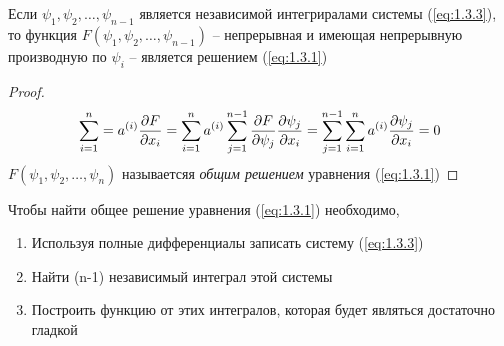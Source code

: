 \documentclass[../main.tex]{subfiles}
\begin{document}
\begin{theorem}
    Если $\psi_1, \psi_2, \dots, \psi_{n-1}$ является независимой интегриралами системы (\ref*{eq:1.3.3}),
    то функция $F(\psi_1, \psi_2, \dots, \psi_{n-1})$ -- непрерывная и имеющая непрерывную
    производную по $\psi_i$ -- является решением (\ref*{eq:1.3.1})
\end{theorem}
\begin{proof}
    \begin{gather*}
        \sum_{i=1}^n = a^{(i)}\frac{\partial F}{\partial x_i} =
        \sum_{i=1}^n a^{(i)} \sum_{j=1}^{n-1}\frac{\partial F}{\partial \psi_j}\frac{\partial \psi_j}{\partial x_i} =
        \sum_{j=1}^{n-1} \sum_{i=1}^n a^{(i)} \frac{\partial \psi_j}{\partial x_i} = 0
    \end{gather*}
    $F(\psi_1, \psi_2,\dots,\psi_n)$ называетсяя \textit{общим решением} уравнения (\ref*{eq:1.3.1})
\end{proof}
Чтобы найти общее решение уравнения (\ref*{eq:1.3.1}) необходимо,
\begin{enumerate}
    \item Используя полные дифференциалы записать систему (\ref*{eq:1.3.3})
    \item Найти (n-1) независимый интеграл этой системы
    \item Построить функцию от этих интегралов, которая будет являться достаточно гладкой
\end{enumerate} 
\end{document}
